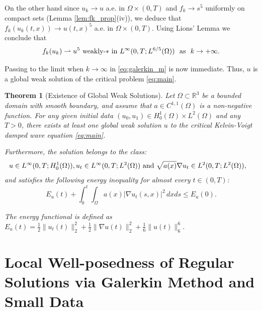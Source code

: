 \documentclass[11pt,letterpaper]{amsart}
\newtheorem{theorem}{Theorem}[section]
\begin{document}
On the other hand since $u_k \to u$ a.e. in $\Omega \times (0,T)$ and $f_k \to s^5$ uniformly on compact sets (Lemma \ref{lem:fk_prop}(iv)), we deduce that $f_k(u_k(t,x)) \to u(t,x)^5$ a.e. in $\Omega \times (0,T)$.
Using Lions' Lemma we conclude that
\begin{equation}
f_k(u_k) \rightharpoonup u^5 \text{ weakly-$\ast$ in } L^\infty(0,T; L^{6/5}(\Omega))~\hbox{ as }~k \to +\infty.
\end{equation}

Passing to the limit when $k \to \infty$ in \eqref{eq:galerkin_m} is now immediate. Thus, $u$ is a global weak solution of the critical problem \eqref{eq:main}.
\begin{theorem}[Existence of Global Weak Solutions]\label{thm:existence_weak}
Let $\Omega \subset \mathbb{R}^3$ be a bounded domain with smooth boundary, and assume that $a \in C^{1,1}(\Omega)$ is a non-negative function. For any given initial data $(u_0, u_1) \in H_0^1(\Omega) \times L^2(\Omega)$ and any $T > 0$, there exists at least one global weak solution $u$ to the critical Kelvin-Voigt damped wave equation \eqref{eq:main}.

Furthermore, the solution belongs to the class:
\begin{align*}
    u \in L^\infty(0,T; H_0^1(\Omega)), u_t \in L^\infty(0,T; L^2(\Omega))\hbox{ and } \sqrt{a(x)}\nabla u_t &\in L^2(0,T; L^2(\Omega)),
\end{align*}
and satisfies the following energy inequality for almost every $t \in (0,T)$:
\begin{equation}\label{eq:energy_ineq_weak}
    E_u(t) + \int_0^t \int_\Omega a(x) |\nabla u_t(s,x)|^2 \, dx ds \leq E_u(0).
\end{equation}

The energy functional is defined as $E_u(t) = \frac{1}{2}\|u_t(t)\|_2^2 + \frac{1}{2}\|\nabla u(t)\|_2^2 + \frac{1}{6}\|u(t)\|_6^6$.
\end{theorem}


\section{Local Well-posedness of Regular Solutions via Galerkin Method and Small Data}
\end{document}
